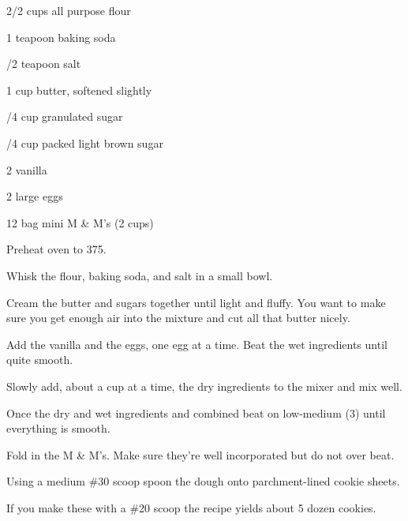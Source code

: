 
\begin{IngredientsAndSteps}
    \ListIngredientsAndSteps
    {
        2/2 cups all purpose flour

        1 teapoon baking soda

        /2 teapoon salt

        \IngredientsSeparatorClear

        1 cup butter, softened slightly

        /4 cup granulated sugar

        /4 cup packed light brown sugar

        \IngredientsSeparatorClear

        2 \tsp[s] vanilla

        2 large eggs

        12 \Ounce bag mini M \& M's (2 cups)
    }
    {
        Preheat oven to 375\Degrees[F].

        Whisk the flour, baking soda, and salt in a small bowl.

        Cream the butter and sugars together until light and fluffy. You want to make sure you get
        enough air into the mixture and cut all that butter nicely.

        Add the vanilla and the eggs, one egg at a time. Beat the wet ingredients until quite smooth.

        Slowly add, about a cup at a time, the dry ingredients to the mixer and mix well.

        Once the dry and wet ingredients and combined beat on low-medium (3) until
        everything is smooth.

        Fold in the M \& M's. Make sure they're well incorporated but do not over beat.

        Using a medium \#30 scoop spoon the dough onto parchment-lined cookie sheets.
    }
\end{IngredientsAndSteps}


\begin{ChefNotes}
    {If you make these with a \#20 scoop the recipe yields about 5 dozen cookies.}
\end{ChefNotes}

